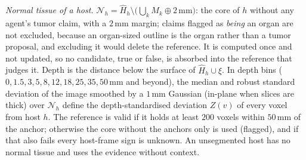 \documentclass[fleqn,10pt]{olplainarticle}
\begin{document}
\emph{Normal tissue of a host.} $\mathcal{N}_h=\hat H_h\setminus\bigl(\bigcup_k M_k\oplus2\,\mathrm{mm}\bigr)$: the core of
$h$ without any agent's tumor claim, with a $2$\,mm margin; claims flagged as \emph{being} an organ are not excluded, because an
organ-sized outline is the organ rather than a tumor proposal, and excluding it would delete the reference. It is computed once and not updated, so no candidate, true or
false, is absorbed into the reference that judges it. Depth is the distance below the surface of $\hat H_h\cup\xi$. In
depth bins ($0,1.5,3,5,8,12,18,25,35,50$\,mm and beyond), the median and robust standard deviation of the image smoothed by
a $1$\,mm Gaussian (in-plane when slices are thick) over $\mathcal{N}_h$ define the depth-standardised deviation $Z(v)$ of
every voxel from host $h$. The reference is valid if it holds at least $200$ voxels within $50$\,mm of the anchor; otherwise
the core without the anchors only is used (flagged), and if that also fails every host-frame sign is unknown. An
unsegmented host has no normal tissue and uses the evidence without context.
\end{document}

